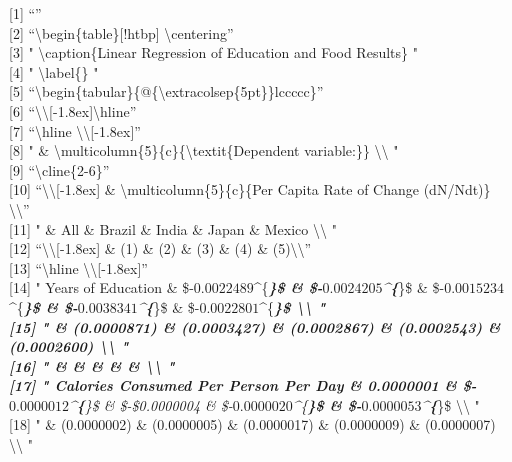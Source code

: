 \documentclass[]{article}
\begin{document}
{[}1{]} ``''\\
{[}2{]} ``\textbackslash{}begin\{table\}{[}!htbp{]}
\textbackslash{}centering''\\
{[}3{]} " \textbackslash{}caption\{Linear Regression of Education and
Food Results\} "\\
{[}4{]} " \textbackslash{}label\{\} "\\
{[}5{]}
``\textbackslash{}begin\{tabular\}\{@\{\textbackslash{}extracolsep\{5pt\}\}lccccc\}''\\
{[}6{]}
``\textbackslash{}\textbackslash{}{[}-1.8ex{]}\textbackslash{}hline''\\
{[}7{]} ``\textbackslash{}hline
\textbackslash{}\textbackslash{}{[}-1.8ex{]}''\\
{[}8{]} " \&
\textbackslash{}multicolumn\{5\}\{c\}\{\textbackslash{}textit\{Dependent
variable:\}\} \textbackslash{}\textbackslash{} "\\
{[}9{]} ``\textbackslash{}cline\{2-6\}''\\
{[}10{]} ``\textbackslash{}\textbackslash{}{[}-1.8ex{]} \&
\textbackslash{}multicolumn\{5\}\{c\}\{Per Capita Rate of Change
(dN/Ndt)\} \textbackslash{}\textbackslash{}''\\
{[}11{]} " \& All \& Brazil \& India \& Japan \& Mexico
\textbackslash{}\textbackslash{} "\\
{[}12{]} ``\textbackslash{}\textbackslash{}{[}-1.8ex{]} \& (1) \& (2) \&
(3) \& (4) \& (5)\textbackslash{}\textbackslash{}''\\
{[}13{]} ``\textbackslash{}hline
\textbackslash{}\textbackslash{}{[}-1.8ex{]}''\\
{[}14{]} " Years of Education \&
\$-\(0.0022489\)\^{}\{\textbf{\emph{\}\$ \& \$-\(0.0024205\)\^{}\{}}\}\$
\& \$-\(0.0015234\)\^{}\{\textbf{\emph{\}\$ \&
\$-\(0.0038341\)\^{}\{}}\}\$ \& \$-\(0.0022801\)\^{}\{\emph{\textbf{\}\$
\textbackslash{}\textbackslash{} "\\
{[}15{]} " \& (0.0000871) \& (0.0003427) \& (0.0002867) \& (0.0002543)
\& (0.0002600) \textbackslash{}\textbackslash{} "\\
{[}16{]} " \& \& \& \& \& \textbackslash{}\textbackslash{} "\\
{[}17{]} " Calories Consumed Per Person Per Day \& 0.0000001 \&
\$-\(0.0000012\)\^{}\{}\}\$ \& \$-\$0.0000004 \&
\$-\(0.0000020\)\^{}\{\textbf{\}\$ \& \$-\(0.0000053\)\^{}\{}}\}\$
\textbackslash{}\textbackslash{} "\\
{[}18{]} " \& (0.0000002) \& (0.0000005) \& (0.0000017) \& (0.0000009)
\& (0.0000007) \textbackslash{}\textbackslash{} "\\
\end{document}
